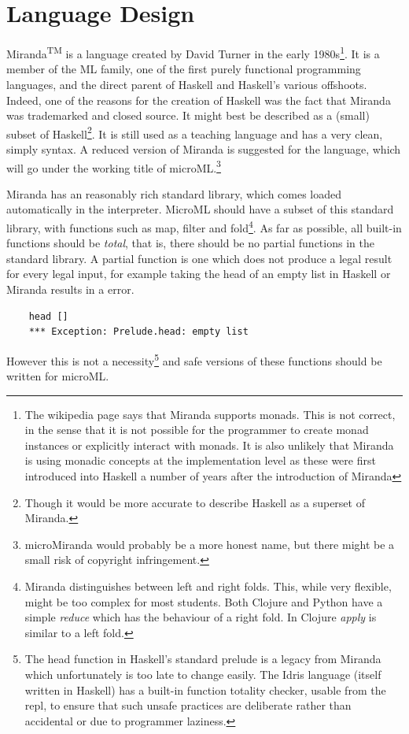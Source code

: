 \documentclass[12pt, a4paper]{report}
\begin{document}
\section{Language Design} 
\label{sec:lang}
Miranda\textsuperscript{TM} is a language
created by David Turner in the early 1980s\footnote{The wikipedia page says that Miranda supports
monads. This is not correct, in the sense that it is not possible for the programmer to create
monad instances or explicitly interact with monads. It is also unlikely that Miranda is using
monadic concepts at the implementation level as these were first introduced into Haskell a number of
years after the introduction of Miranda}. It is a member of the ML family, one of the first purely
functional programming languages, and the direct parent of Haskell and Haskell's various offshoots.
Indeed, one of the reasons for the creation of Haskell was the fact that Miranda was trademarked and
closed source. It might best be described as a (small) subset of Haskell\footnote{Though it would
be more accurate to describe Haskell as a superset of Miranda.}. It is still used as a teaching
language and has a very clean, simply syntax. A reduced version of Miranda is suggested for 
the language, which will go under the working title of microML.\footnote{microMiranda would probably be
a more honest name, but there might be a small risk of copyright infringement.}

Miranda has an reasonably rich standard library, which comes loaded automatically in the
interpreter. MicroML should have a subset of this standard library, with functions such as
map, filter and fold\footnote{Miranda distinguishes between left and right folds. This, while
very flexible, might be too complex for most students. Both Clojure and Python have a simple
\textit{reduce} which has the behaviour of a right fold. In Clojure \textit{apply} is similar to
a left fold.}. As far as possible, all built-in functions should be \textit{total}, that is, there
should be no partial functions in the standard library. A partial function is one which does not
produce a legal result for every legal input, for example taking the head of an empty list in
Haskell or Miranda results in a error.

\begin{verbatim}
    head []
    *** Exception: Prelude.head: empty list
\end{verbatim} 

However this is not a necessity\footnote{The head function in Haskell's standard prelude is a legacy
from Miranda which unfortunately is too late to change easily. The Idris language (itself written in
Haskell) has a built-in function \gls{totality} checker, usable from the repl, to ensure that such unsafe
practices are deliberate rather than accidental or due to programmer laziness.} and safe versions of
these functions should be written for microML\@.
\end{document}
